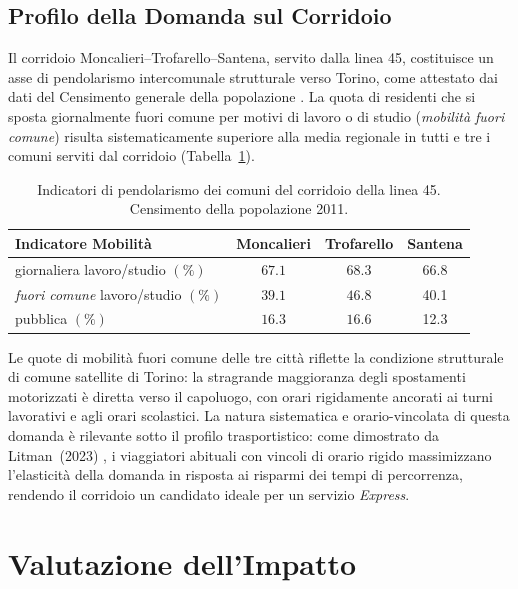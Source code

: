\documentclass[conference]{IEEEtran}
\begin{document}
\subsection{Profilo della Domanda sul Corridoio}

Il corridoio Moncalieri--Trofarello--Santena, servito dalla linea 45, costituisce un asse
di pendolarismo intercomunale strutturale verso Torino, come
attestato dai dati del Censimento generale della popolazione
\cite{istat2011}. La quota di residenti che si sposta
giornalmente fuori comune per motivi di lavoro o di studio
(\textit{mobilità fuori comune}) risulta sistematicamente
superiore alla media regionale in tutti e tre i comuni serviti
dal corridoio (Tabella~\ref{tab:ISTAT}).


\begin{table}[htbp]
\caption{Indicatori di pendolarismo dei comuni del corridoio della linea 45. Censimento della popolazione 2011.}
\label{tab:ISTAT}
\centering
\renewcommand{\arraystretch}{1.15}
\begin{tabular}{@{}lccc@{}}
\toprule
Indicatore \textbf{Mobilità} & Moncalieri & Trofarello & Santena \\
\midrule
giornaliera lavoro/studio $(\%)$  & $67.1$ & $68.3$  & $66.8$  \\
\emph{fuori comune} lavoro/studio $(\%)$ & $39.1$ & $46.8$ & 40.1 \\
pubblica $(\%)$  & $16.3$ & $16.6$ & 12.3 \\
\bottomrule
\end{tabular}
\end{table}

Le quote di mobilità fuori comune delle tre città
riflette la condizione strutturale di comune satellite di
Torino: la stragrande maggioranza degli spostamenti motorizzati
è diretta verso il capoluogo, con orari rigidamente ancorati
ai turni lavorativi e agli orari scolastici. La natura
sistematica e orario-vincolata di questa domanda è rilevante
sotto il profilo trasportistico: come dimostrato da
Litman~(2023) \cite{litman2023}, i viaggiatori abituali con
vincoli di orario rigido massimizzano l'elasticità della
domanda in risposta ai risparmi dei tempi di percorrenza,
rendendo il corridoio un candidato ideale per un servizio
\textit{Express}.

\section{Valutazione dell'Impatto}
\label{sec:impact}
\end{document}

